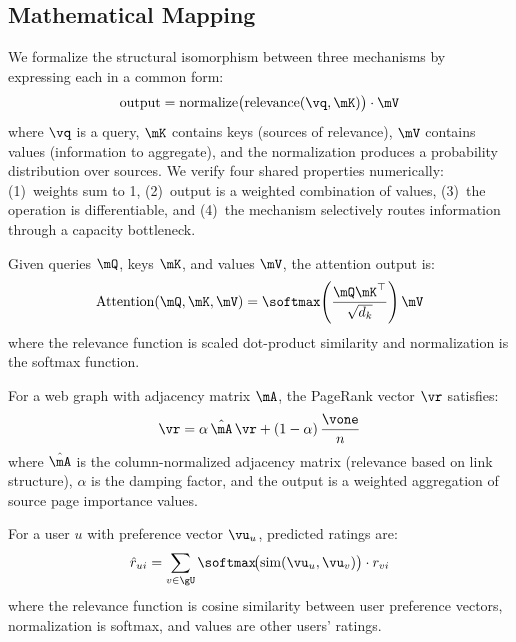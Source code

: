 \subsection{Mathematical Mapping}
\label{sec:math_mapping}

We formalize the structural isomorphism between three mechanisms by expressing each in a common form:
\begin{equation}
\label{eq:general_attention}
\text{output} = \text{normalize}\big(\text{relevance}(\vq, \mK)\big) \cdot \mV
\end{equation}
where $\vq$ is a query, $\mK$ contains keys (sources of relevance), $\mV$ contains values (information to aggregate), and the normalization produces a probability distribution over sources. We verify four shared properties numerically: (1)~weights sum to 1, (2)~output is a weighted combination of values, (3)~the operation is differentiable, and (4)~the mechanism selectively routes information through a capacity bottleneck.

Given queries $\mQ$, keys $\mK$, and values $\mV$, the attention output is:
\begin{equation}
\label{eq:transformer_attn}
\text{Attention}(\mQ, \mK, \mV) = \softmax\!\left(\frac{\mQ \mK^\top}{\sqrt{d_k}}\right) \mV
\end{equation}
where the relevance function is scaled dot-product similarity and normalization is the softmax function.

For a web graph with adjacency matrix $\mA$, the PageRank vector $\vr$ satisfies:
\begin{equation}
\label{eq:pagerank}
\vr = \alpha \, \hat{\mA} \, \vr + (1 - \alpha) \, \frac{\vone}{n}
\end{equation}
where $\hat{\mA}$ is the column-normalized adjacency matrix (relevance based on link structure), $\alpha$ is the damping factor, and the output is a weighted aggregation of source page importance values.

For a user $u$ with preference vector $\vu_u$, predicted ratings are:
\begin{equation}
\label{eq:collab}
\hat{r}_{ui} = \sum_{v \in \gU} \softmax\!\big(\text{sim}(\vu_u, \vu_v)\big) \cdot r_{vi}
\end{equation}
where the relevance function is cosine similarity between user preference vectors, normalization is softmax, and values are other users' ratings.
